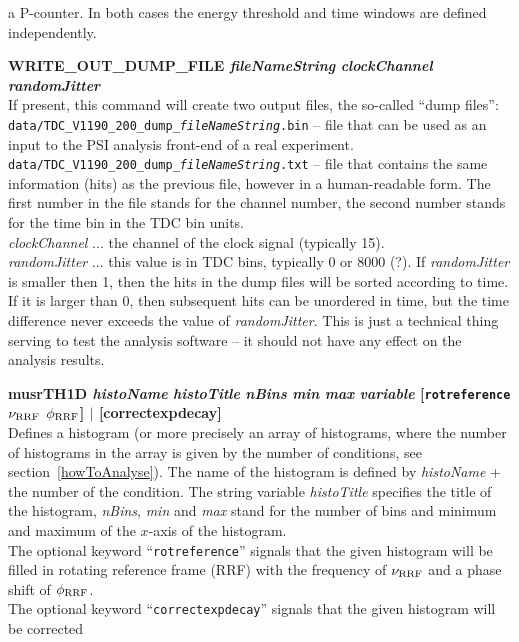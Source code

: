 \documentclass[twoside]{dis04}
\begin{document}
\begin{description}
	 a P-counter.  In both cases the energy threshold and time windows are defined independently.
   \item{\bf WRITE\_OUT\_DUMP\_FILE \emph{fileNameString} \emph{clockChannel} \emph{randomJitter}}\\
         If present, this command will create two output files, the so-called ``dump files'':\\
	 {\tt data/TDC\_V1190\_200\_dump\_\emph{fileNameString}.bin} -- file that can be used
	 as an input to the PSI analysis front-end of a real experiment.\\
	 {\tt data/TDC\_V1190\_200\_dump\_\emph{fileNameString}.txt} -- file that contains the same
	 information (hits) as the previous file, however in a human-readable form.  The first number in the file
	 stands for the channel number, the second number stands for the time bin in the TDC bin units.\\
	 \emph{clockChannel} ... the channel of the clock signal (typically 15).\\
	 \emph{randomJitter} ... this value is in TDC bins, typically 0 or 8000 (?).  If \emph{randomJitter} is smaller then
	 1, then the hits in the dump files will be sorted according to time.  If it is larger than 0, then
	 subsequent hits can be unordered in time, but the time difference never exceeds the value of \emph{randomJitter}.
	 This is just a technical thing serving to test the analysis software -- it should not
	 have any effect on the analysis results.
   \item{\bf musrTH1D \emph{histoName} \emph{histoTitle} \emph{nBins} \emph{min} \emph{max} \emph{variable} 
        [{\tt rotreference} $\nu_{\rm RRF}$ $\phi_{\rm RRF}$] $|$ [correctexpdecay]} \\
         Defines a histogram (or more precisely an array of histograms, where the number of histograms
	 in the array is given by the number of conditions, see section~\ref{howToAnalyse}).
	 The name of the histogram is defined by \emph{histoName} + the number of the condition.
	 The string variable \emph{histoTitle} specifies the title of the histogram, 
	 \emph{nBins}, \emph{min} and \emph{max} stand for the number of bins and minimum and maximum
	 of the $x$-axis of the histogram.  \\
	 The optional keyword ``{\tt rotreference}'' signals that the given histogram will be filled in
	 rotating reference frame (RRF) with the frequency of $\nu_{\rm RRF}$ and a phase shift of $\phi_{\rm RRF}$.
	 \\
	 The optional keyword ``{\tt correctexpdecay}'' signals that the given histogram will be corrected

\end{description}
\end{document}
